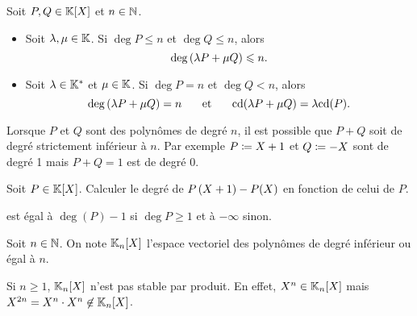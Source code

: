 \documentclass{magnolia}
\begin{document}
\begin{proposition}
Soit $P,Q\in\polyK$ et $n\in\mathbb{N}$.
\begin{itemize}
\item Soit $\lambda,\mu\in\mathbb{K}$. Si $\deg P\leq n$ et $\deg Q\leq n$, alors
  \[\deg\left(\lambda P+\mu Q\right)\leqslant n.\]
\item Soit $\lambda\in\mathbb{K}^*$ et $\mu\in\mathbb{K}$. Si $\deg P=n$ et $\deg Q<n$, alors
  \[\deg\left(\lambda P+\mu Q\right)=n \quad\quad\!\text{et}\quad\!\quad {\rm cd}(\lambda P+\mu Q)=\lambda{\rm cd}(P).\]
\end{itemize}
\end{proposition}

\begin{remarqueUnique}
\remarque Lorsque $P$ et $Q$ sont des polynômes de degré $n$, il est possible que
  $P+Q$ soit de degré strictement inférieur à $n$. Par exemple $P\coloneqq X+1$ et
  $Q\coloneqq -X$ sont de degré 1 mais $P+Q=1$ est de degré 0.
\end{remarqueUnique}

\begin{exoUnique}
\exo Soit $P\in\polyK$. Calculer le degré de $P\left(X+1\right)-P(X)$ en fonction de celui de $P$.
  \begin{sol}
  est égal à $\deg(P)-1$ si $\deg P\geq 1$ et à $-\infty$ sinon.  
  \end{sol}
\end{exoUnique}

\begin{definition}
Soit $n\in\mathbb{N}$. On note $\polyK[n]$ l'espace vectoriel des polynômes de degré inférieur ou égal à $n$.
\end{definition}

\begin{remarqueUnique}
\remarque Si $n\geq 1$, $\polyK[n]$ n'est pas stable par produit. En effet,
  $X^n\in\polyK[n]$ mais $X^{2n}=X^{n}\cdot X^n\not\in\polyK[n]$.
\end{remarqueUnique}


\end{document}
